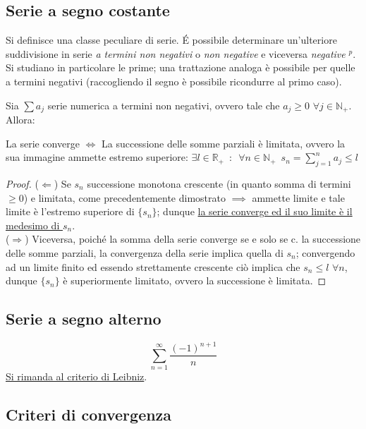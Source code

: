 \documentclass[10pt]{article}
\theoremstyle{plain}
\begin{document}
\subsection{Serie a segno costante}
Si definisce una classe peculiare di serie. \'E possibile determinare un'ulteriore suddivisione in serie \textit{a termini non negativi} o \textit{non negative} e viceversa \textit{negative} \hypertarget{posit}{$^p$}. Si studiano in particolare le prime; una trattazione analoga è possibile per quelle a termini negativi (raccogliendo il segno è possibile ricondurre al primo caso).

\begin{ther}
Sia $\sum a_j$ serie numerica a termini non negativi, ovvero tale che $a_j \geq 0$ $\forall j \in \mathbb{N}_+$. Allora:
\begin{center}
    La serie converge $\Longleftrightarrow$ La successione delle somme parziali è limitata, ovvero la sua immagine ammette estremo superiore: $\exists l \in \mathbb{R}_+ \enspace : \enspace \forall n \in \mathbb{N}_+ \enspace s_n = \sum_{j=1}^{n} a_j \leq l$
\end{center}
\end{ther}
\begin{proof}
($\Leftarrow$) Se $s_n$ successione monotona crescente (in quanto somma di termini $\geq 0$) e limitata, come precedentemente dimostrato $\implies$ ammette limite e tale limite è l'estremo superiore di $\{s_n\}$; dunque \hyperlink{sommeparziali}{la serie converge ed il suo limite è il medesimo di $s_n$}.  
\\($\Rightarrow$) Viceversa, poiché la somma della serie converge se e solo se c. la successione delle somme parziali, la convergenza della serie implica quella di $s_n$; convergendo ad un limite finito ed essendo strettamente crescente ciò implica che $s_n \leq l$ $\forall n$, dunque $\{s_n\}$ è superiormente limitato, ovvero la successione è limitata.
\end{proof}

\subsection{Serie a segno alterno}
\[\sum \limits_{n = 1}^{\infty} \frac{(-1)^{n+1}}{n}\]
\hyperlink{leibniz}{Si rimanda al criterio di Leibniz}.

\subsection{Criteri di convergenza}
\end{document}
